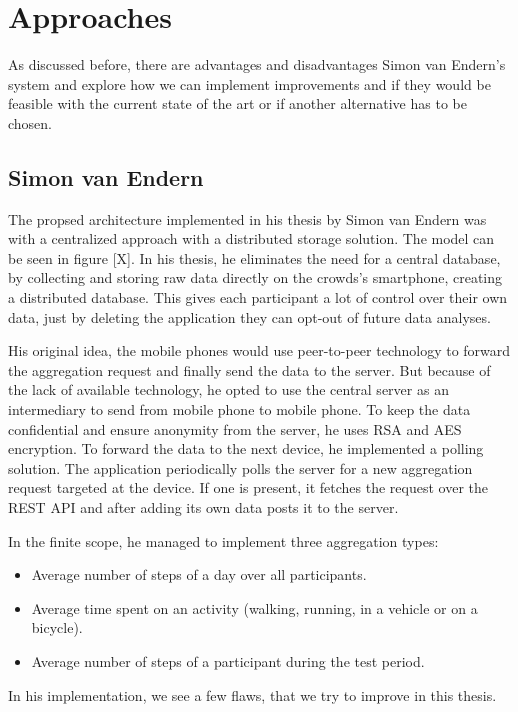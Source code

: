 \section{Approaches}
As discussed before, there are advantages and disadvantages Simon van Endern's system and explore how we can implement improvements and if they would be feasible with the current state of the art or if another alternative has to be chosen.

\subsection{Simon van Endern}
The propsed architecture implemented in his thesis by Simon van Endern was with a centralized approach with a distributed storage solution. The model can be seen in figure [X].
In his thesis, he eliminates the need for a central database, by collecting and storing raw data directly on the crowds's smartphone, creating a distributed database. This gives each participant a lot of control over their own data, just by deleting the application they can opt-out of future data analyses.

His original idea, the mobile phones would use peer-to-peer technology to forward the aggregation request and finally send the data to the server. But because of the lack of available technology, he opted to use the central server as an intermediary to send from mobile phone to mobile phone. To keep the data confidential and ensure anonymity from the server, he uses RSA and AES encryption. To forward the data to the next device, he implemented a polling solution. The application periodically polls the server for a new aggregation request targeted at the device. If one is present, it fetches the request over the REST API and after adding its own data posts it to the server.

In the finite scope, he managed to implement three aggregation types:
\begin{itemize}
	\item Average number of steps of a day over all participants. 
	\item Average time spent on an activity (walking, running, in a vehicle or on a bicycle).
	\item Average number of steps of a participant during the test period. 
\end{itemize}

In his implementation, we see a few flaws, that we try to improve in this thesis. 

